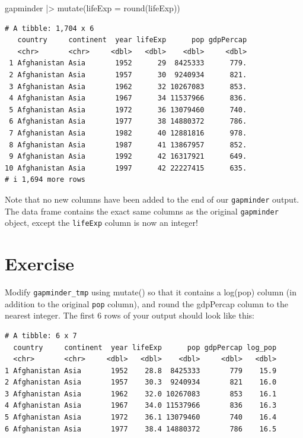 \documentclass[
  letterpaper,
  DIV=11,
  numbers=noendperiod]{scrreprt}
\newenvironment{Shaded}{\begin{snugshade}}{\end{snugshade}}
\newcommand{\AttributeTok}[1]{\textcolor[rgb]{0.40,0.45,0.13}{#1}}
\newcommand{\FunctionTok}[1]{\textcolor[rgb]{0.28,0.35,0.67}{#1}}
\newcommand{\NormalTok}[1]{\textcolor[rgb]{0.00,0.23,0.31}{#1}}
\newcommand{\SpecialCharTok}[1]{\textcolor[rgb]{0.37,0.37,0.37}{#1}}
\begin{document}
\begin{Shaded}
\begin{Highlighting}[]
\NormalTok{gapminder }\SpecialCharTok{|\textgreater{}} \FunctionTok{mutate}\NormalTok{(}\AttributeTok{lifeExp =} \FunctionTok{round}\NormalTok{(lifeExp)) }
\end{Highlighting}
\end{Shaded}

\begin{verbatim}
# A tibble: 1,704 x 6
   country     continent  year lifeExp      pop gdpPercap
   <chr>       <chr>     <dbl>   <dbl>    <dbl>     <dbl>
 1 Afghanistan Asia       1952      29  8425333      779.
 2 Afghanistan Asia       1957      30  9240934      821.
 3 Afghanistan Asia       1962      32 10267083      853.
 4 Afghanistan Asia       1967      34 11537966      836.
 5 Afghanistan Asia       1972      36 13079460      740.
 6 Afghanistan Asia       1977      38 14880372      786.
 7 Afghanistan Asia       1982      40 12881816      978.
 8 Afghanistan Asia       1987      41 13867957      852.
 9 Afghanistan Asia       1992      42 16317921      649.
10 Afghanistan Asia       1997      42 22227415      635.
# i 1,694 more rows
\end{verbatim}

Note that no new columns have been added to the end of our
\texttt{gapminder} output. The data frame contains the exact same
columns as the original \texttt{gapminder} object, except the
\texttt{lifeExp} column is now an integer!

\section{Exercise}

Modify \texttt{gapminder\_tmp} using mutate() so that it contains a
log(pop) column (in addition to the original \texttt{pop} column), and
round the gdpPercap column to the nearest integer. The first 6 rows of
your output should look like this:

\begin{verbatim}
# A tibble: 6 x 7
  country     continent  year lifeExp      pop gdpPercap log_pop
  <chr>       <chr>     <dbl>   <dbl>    <dbl>     <dbl>   <dbl>
1 Afghanistan Asia       1952    28.8  8425333       779    15.9
2 Afghanistan Asia       1957    30.3  9240934       821    16.0
3 Afghanistan Asia       1962    32.0 10267083       853    16.1
4 Afghanistan Asia       1967    34.0 11537966       836    16.3
5 Afghanistan Asia       1972    36.1 13079460       740    16.4
6 Afghanistan Asia       1977    38.4 14880372       786    16.5
\end{verbatim}
\end{document}
